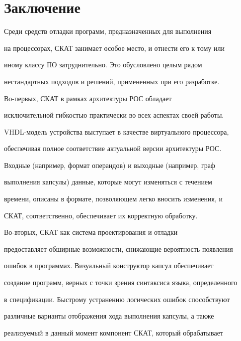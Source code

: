 

\section{Заключение}





      Среди средств отладки программ, предназначенных для выполнения 


на процессорах, СКАТ занимает особое место, и отнести его к тому или 


иному классу ПО затруднительно. Это обусловлено целым рядом 


нестандартных подходов и решений, примененных при его разработке. 


      


      Во-первых, СКАТ в рамках архитектуры РОС обладает 


исключительной гибкостью практически во всех аспектах своей работы. 


VHDL-мо\-дель устройства выступает в качестве виртуального процессора, 


обеспечивая полное соответствие актуальной версии архитектуры РОС. 


Входные (например, формат операндов) и выходные (например, граф 


выполнения капсулы) данные, которые могут изменяться с течением 


времени, описаны в формате, позволяющем легко вносить изменения, и 


СКАТ, соответственно, обеспечивает их корректную обработку.


      


      Во-вторых, СКАТ как система проектирования и отладки 


предоставляет обширные возможности, снижающие вероятность появления 


ошибок в программах. Визуальный конструктор кап\-сул обеспечивает 


создание программ, верных с точки зрения синтаксиса языка, определенного 


в спецификации. Быстрому устранению логических ошибок способствуют 


различные варианты отображения хода выполнения капсулы, а также 


ре\-а\-ли\-зу\-емый в данный момент компонент СКАТ, который обрабатывает 


